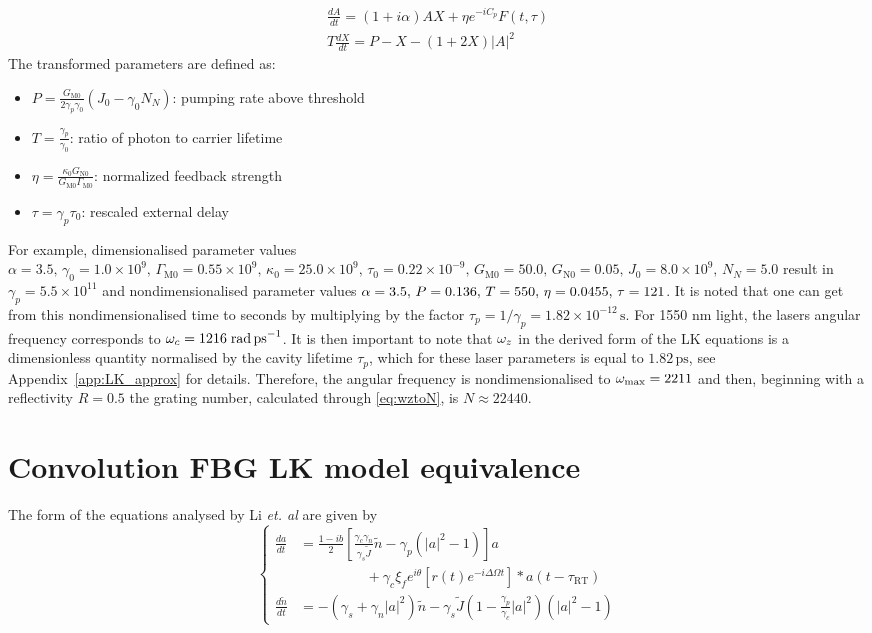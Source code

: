 %
\[
\begin{gathered}
\frac{d A}{d t} = (1 + i \alpha) A X + \eta e^{-i C_p} F(t,\tau) \\
T \frac{d X}{d t} = P - X - (1 + 2X)|A|^2
\end{gathered}
\]
%
The transformed parameters are defined as:
%
\begin{itemize}
  \item \( P = \frac{G_{\mathrm{M}0}}{2 \gamma_p \gamma_0}(J_0 - \gamma_0 N_N) \): pumping rate above threshold
  \item \( T = \frac{\gamma_p}{\gamma_0} \): ratio of photon to carrier lifetime
  \item \( \eta = \frac{\kappa_0 G_{\mathrm{N}0}}{G_{\mathrm{M}0} \Gamma_{\mathrm{M}0}} \): normalized feedback strength
  \item \( \tau = \gamma_p \tau_0 \): rescaled external delay
\end{itemize}
%
For example, dimensionalised parameter values $\alpha = 3.5, \, \gamma_0 = 1.0 \times 10^9, \, \Gamma_{\mathrm{M}0} = 0.55 \times 10^9,\,
\kappa_0 = 25.0 \times 10^9, \, \tau_0 = 0.22 \times 10^{-9}, \, G_{\mathrm{M}0} = 50.0, \, G_{\mathrm{N}0} = 0.05, \, J_0 = 8.0 \times 10^9, \,
N_N = 5.0$ result in $\gamma_p = 5.5 \times 10^{11}$ and nondimensionalised parameter values $\alpha = 3.5, \, P = 0.136, \, T = 550, \, \eta = 0.0455, \, \tau = 121$.
%
It is noted that one can get from this nondimensionalised time to seconds by multiplying by the factor $\tau_p = 1/\gamma_p = 1.82 \times 10^{-12}\,\text{s}$.
For 1550 nm light, the lasers angular frequency corresponds to $\omega_c=1216\;\text{rad\,ps}^{-1}$. 
It is then important to note that $\omega_z$ in the derived form of the LK equations is a dimensionless quantity normalised by the cavity lifetime $\tau_p$, 
which for these laser parameters is equal to $1.82 \,\text{ps}$, see Appendix~\ref{app:LK_approx} for details. 
Therefore, the angular frequency is nondimensionalised to $\omega_\text{max}=2211$ and then, beginning with a reflectivity $R = 0.5$ the grating number, calculated through \eqref{eq:wztoN}, is $N \approx 22440$. 
%
%
\section{Convolution FBG LK model equivalence}
\label{app:Li_chaos_nondim}
%
The form of the equations analysed by Li \textit{et. al} \cite{li2012distributed,li2015chaotic,li2020stable} are given by
%
\begin{equation}
\left\{
\begin{aligned}
\frac{d a}{d t} &= \frac{1-i b}{2}
   \left[\frac{\gamma_{c} \gamma_{n}}{\gamma_{s} \tilde{J}} \tilde{n}
         - \gamma_{p}\left(|a|^{2}-1\right)\right] a \\
&\hspace{2cm} + \gamma_{c} \xi_{f} e^{i \theta}
   \left[r(t) e^{-i \Delta \Omega t}\right] * a\!\left(t-\tau_\text{RT}\right) \\
\frac{d \tilde{n}}{d t} &= -\left(\gamma_{s}+\gamma_{n}|a|^{2}\right) \tilde{n}
   - \gamma_{s} \tilde{J}\left(1-\frac{\gamma_{p}}{\gamma_{c}}|a|^{2}\right)
   \left(|a|^{2}-1\right)
\end{aligned}
\right.
\end{equation}

